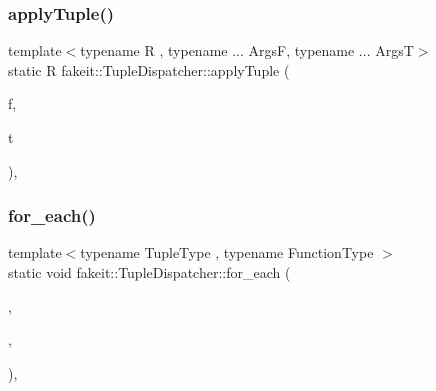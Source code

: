 \subsubsection{\texorpdfstring{applyTuple()}{applyTuple()}\hspace{0.1cm}{\footnotesize\ttfamily [9/9]}}
{\footnotesize\ttfamily template$<$typename R , typename ... ArgsF, typename ... ArgsT$>$ \\
static R fakeit\+::\+Tuple\+Dispatcher\+::apply\+Tuple (\begin{DoxyParamCaption}\item[{std\+::function$<$ R(ArgsF \&...)$>$}]{f,  }\item[{std\+::tuple$<$ Args\+T... $>$ \&}]{t }\end{DoxyParamCaption})\hspace{0.3cm}{\ttfamily [inline]}, {\ttfamily [static]}}

\mbox{\label{structfakeit_1_1TupleDispatcher_af22c1fae8c695f722da986df9af411ca}} 
\subsubsection{\texorpdfstring{for\_each()}{for\_each()}\hspace{0.1cm}{\footnotesize\ttfamily [1/54]}}
{\footnotesize\ttfamily template$<$typename Tuple\+Type , typename Function\+Type $>$ \\
static void fakeit\+::\+Tuple\+Dispatcher\+::for\+\_\+each (\begin{DoxyParamCaption}\item[{Tuple\+Type \&\&}]{,  }\item[{Function\+Type \&}]{,  }\item[{std\+::integral\+\_\+constant$<$ size\+\_\+t, std\+::tuple\+\_\+size$<$ typename std\+::remove\+\_\+reference$<$ Tuple\+Type $>$\+::type $>$\+::value $>$}]{ }\end{DoxyParamCaption})\hspace{0.3cm}{\ttfamily [inline]}, {\ttfamily [static]}}

\mbox{\label{structfakeit_1_1TupleDispatcher_afd32e025fbf695e16bb4b4ac1642c491}} 
